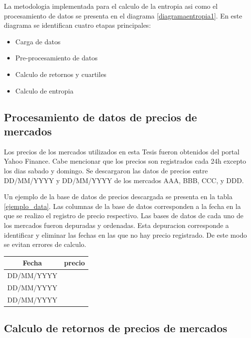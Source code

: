 La metodologia implementada para el calculo de la entropia asi como el procesamiento de datos se presenta en el diagrama \ref{diagramaentropia1}.
En este diagrama se identifican cuatro etapas principales:

\begin{itemize}
	\item Carga de datos
	\item Pre-procesamiento de datos
	\item Calculo de retornos y cuartiles
	\item Calculo de entropia
\end{itemize}

\subsection{Procesamiento de datos de precios de mercados}

Los precios de los mercados utilizados en esta Tesis fueron obtenidos del portal Yahoo Finance. 
Cabe mencionar que los precios son registrados cada 24h excepto los dias sabado y domingo.
Se descargaron las datos de precios entre DD/MM/YYYY y DD/MM/YYYY de los mercados AAA, BBB, CCC, y DDD.

Un ejemplo de la base de datos de precios descargada se presenta en la tabla \ref{ejemplo_data}.
Las columnas de la base de datos corresponden a la fecha en la que se realizo el registro de precio respectivo.
Las bases de datos de cada uno de los mercados fueron depuradas y ordenadas. Esta depuracion corresponde a identificar y eliminar las fechas en las que no hay precio registrado. De este modo se evitan errores de calculo.

\begin{center}
\begin{tabular}{|c|c|}
	\hline 
	Fecha & precio \\ 
	\hline 
	DD/MM/YYYY & $$$$ \\ 
	\hline 
	DD/MM/YYYY & $$$$ \\ 
	\hline 
	DD/MM/YYYY & $$$$ \\ 
	\hline 
\end{tabular} 
	\label{ejemplo_data}
\end{center}

\subsection{Calculo de retornos de precios de mercados}

